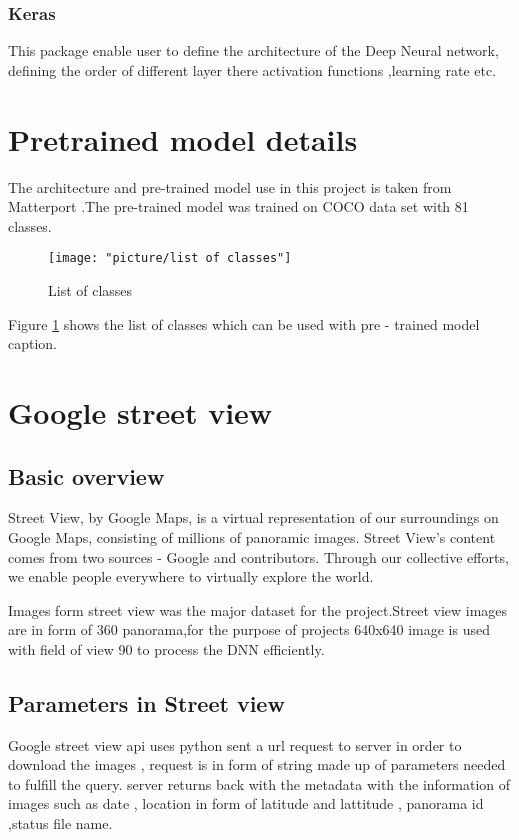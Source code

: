 \subsubsection{Keras}
This package enable user to define the architecture of the Deep Neural network, defining the order of different layer there activation functions ,learning rate etc.

\section{Pretrained model details}
The architecture and pre-trained model use in this project is taken from Matterport  \cite{matterport_maskrcnn_2017}.The pre-trained model was trained on COCO \cite{DBLP:journals/corr/LinMBHPRDZ14} data set with 81 classes.

\begin{figure}
	\centering
	\texttt{[image: "picture/list of classes"]}
	\caption{List of classes}
	\label{fig:list-of-classes}
\end{figure}

Figure \ref{fig:list-of-classes} shows the list of classes which can be used with pre - trained model caption.

\section{Google street view}


\subsection{Basic overview}
Street View, by Google Maps, is a virtual representation of our surroundings on Google Maps, consisting of millions of panoramic images. Street View’s content comes from two sources - Google and contributors. Through our collective efforts, we enable people everywhere to virtually explore the world.\cite{Developers.google.com2018}

Images form street view was the major dataset for the project.Street view images are in form of 360 panorama,for the purpose of projects 640x640 image is used with field of view 90 to process the DNN efficiently.  


\subsection{Parameters in Street view }
Google street view api uses python sent a url request to server in order to download the images , request is in form of string made up of parameters needed to fulfill the query. server returns back with the metadata with the information of images such as date , location in form of latitude and lattitude , panorama id ,status file name. 

